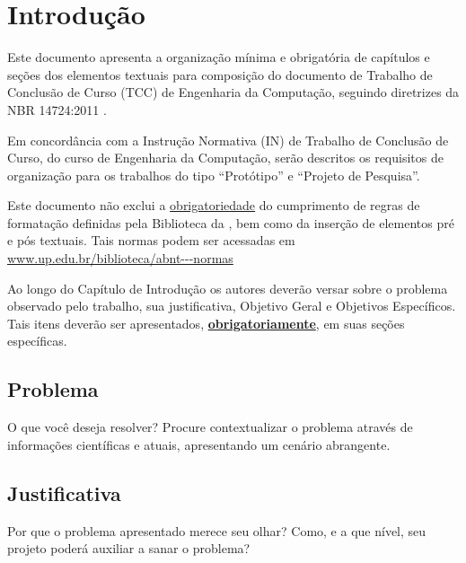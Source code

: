 \chapter{Introdução}
\label{cap:introducao}

Este documento apresenta a organização mínima e obrigatória de capítulos e seções dos elementos textuais para composição do documento de Trabalho de Conclusão de Curso (TCC) de Engenharia da Computação, seguindo diretrizes da NBR 14724:2011 \cite{ABNT2011}. 

Em concordância com a Instrução Normativa (IN) de Trabalho de Conclusão de Curso, do curso de Engenharia da Computação, serão descritos os requisitos de organização para os trabalhos do tipo “Protótipo” e “Projeto de Pesquisa”.

Este documento não exclui a \underline{obrigatoriedade} do cumprimento de regras de formatação definidas pela Biblioteca da , bem como da inserção de elementos pré e pós textuais. Tais normas podem ser acessadas em \url{www.up.edu.br/biblioteca/abnt---normas}

Ao longo do Capítulo de Introdução os autores deverão versar sobre o problema observado pelo trabalho, sua justificativa, Objetivo Geral e Objetivos Específicos. Tais itens deverão ser apresentados, \textbf{\underline{obrigatoriamente}}, em suas seções específicas.

\section{Problema}
\label{sec:problema}

O que você deseja resolver? Procure contextualizar o problema através de informações científicas e atuais, apresentando um cenário abrangente.

\section{Justificativa}
\label{sec:justificativa}

Por que o problema apresentado merece seu olhar? Como, e a que nível, seu projeto poderá auxiliar a sanar o problema? 

